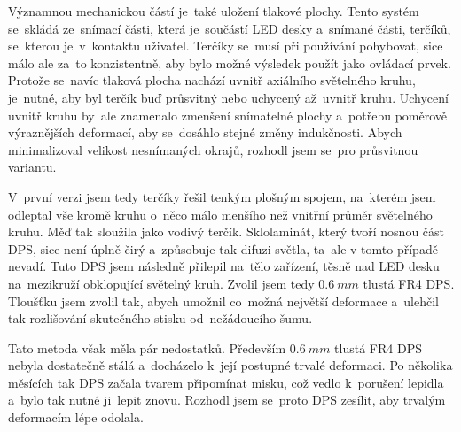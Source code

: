 Významnou mechanickou částí je~také uložení tlakové plochy.
Tento systém se~skládá ze~snímací části, která je~součástí LED desky a~snímané části, terčíků, se~kterou je~v~kontaktu uživatel.
Terčíky se~musí při používání pohybovat, sice málo ale za~to konzistentně, aby bylo možné výsledek použít jako ovládací prvek.
Protože se~navíc tlaková plocha nachází uvnitř axiálního světelného kruhu, je~nutné, aby byl terčík buď průsvitný nebo uchycený až~uvnitř kruhu.
Uchycení uvnitř kruhu by~ale znamenalo zmenšení snímatelné plochy a~potřebu poměrově výraznějších deformací, aby se~dosáhlo stejné změny indukčnosti.
Abych minimalizoval velikost nesnímaných okrajů, rozhodl jsem se~pro průsvitnou variantu.

V~první verzi jsem tedy terčíky řešil tenkým plošným spojem, na~kterém jsem odleptal vše kromě kruhu o~něco málo menšího než vnitřní průměr světelného kruhu.
Měď tak sloužila jako vodivý terčík.
Sklolaminát, který tvoří nosnou část DPS, sice není úplně čirý a~způsobuje tak difuzi světla, ta~ale v tomto případě nevadí.
Tuto DPS jsem následně přilepil na~tělo zařízení, těsně nad LED desku na~mezikruží obklopující světelný kruh.
Zvolil jsem tedy \(0.6~mm\) tlustá FR4 DPS.
Tloušťku jsem zvolil tak, abych umožnil co~možná největší deformace a~ulehčil tak rozlišování skutečného stisku od~nežádoucího šumu.

Tato metoda však měla pár nedostatků.
Především \(0.6~mm\) tlustá FR4 DPS nebyla dostatečně stálá a~docházelo k~její postupné trvalé deformaci.
Po několika měsících tak DPS začala tvarem připomínat misku, což vedlo k~porušení lepidla a~bylo tak nutné ji~lepit znovu.
Rozhodl jsem se~proto DPS zesílit, aby trvalým deformacím lépe odolala.




